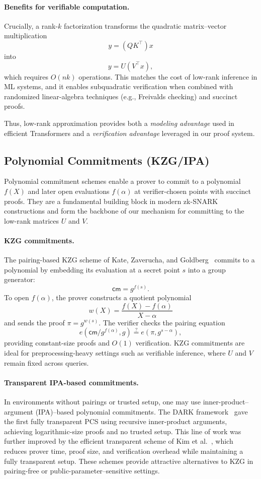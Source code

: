 \documentclass[11pt]{article}
\begin{document}
\vspace{0.7em}
\paragraph{Benefits for verifiable computation.}
Crucially, a rank-$k$ factorization transforms the quadratic 
matrix--vector multiplication
\[
  y = (QK^\top) x
\]
into
\[
  y = U (V^\top x),
\]
which requires $O(n k)$ operations.  
This matches the cost of low-rank inference in ML systems, and it 
enables subquadratic verification when combined with 
randomized linear-algebra techniques (e.g., Freivalds checking) 
and succinct proofs.

Thus, low-rank approximation provides both a 
\emph{modeling advantage} used in efficient Transformers and a 
\emph{verification advantage} leveraged in our proof system.


\subsection{Polynomial Commitments (KZG/IPA)}

Polynomial commitment schemes enable a prover to commit to a polynomial
$f(X)$ and later open evaluations $f(\alpha)$ at verifier-chosen points
with succinct proofs.  
They are a fundamental building block in modern zk-SNARK constructions
and form the backbone of our mechanism for committing to the low-rank
matrices $U$ and $V$.

\paragraph{KZG commitments.}
The pairing-based KZG scheme of Kate, Zaverucha, and Goldberg~\cite{kate2010polynomial}
commits to a polynomial by embedding its evaluation at a secret point $s$
into a group generator:
\[
  \mathsf{cm} = g^{f(s)}.
\]
To open $f(\alpha)$, the prover constructs a quotient polynomial
\[
  w(X) = \frac{f(X) - f(\alpha)}{X - \alpha}
\]
and sends the proof $\pi = g^{w(s)}$.
The verifier checks the pairing equation
\[
  e(\mathsf{cm} / g^{f(\alpha)}, g)
  \stackrel{?}{=} 
  e(\pi, g^{s - \alpha}),
\]
providing constant-size proofs and $O(1)$ verification.
KZG commitments are ideal for preprocessing-heavy settings such as
verifiable inference, where $U$ and $V$ remain fixed across queries.

\paragraph{Transparent IPA-based commitments.}
In environments without pairings or trusted setup, one may use
inner-product–argument (IPA)–based polynomial commitments.
The DARK framework~\cite{bunz2019dark} gave the first fully transparent
PCS using recursive inner-product arguments, achieving logarithmic-size
proofs and no trusted setup.
This line of work was further improved by the efficient transparent
scheme of Kim et al.~\cite{kim2023etpc}, which reduces prover time,
proof size, and verification overhead while maintaining a fully
transparent setup.
These schemes provide attractive alternatives to KZG in pairing-free or
public-parameter–sensitive settings.
\end{document}
